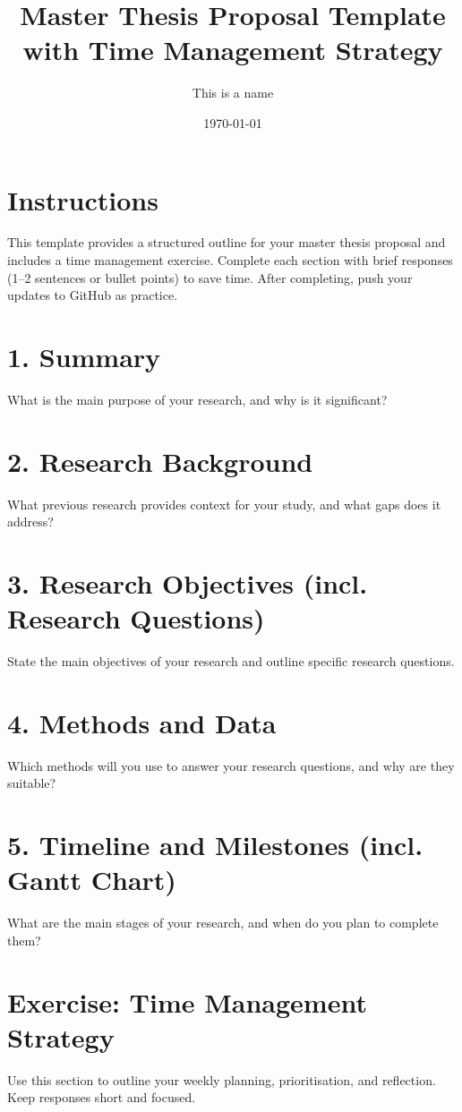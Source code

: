 \documentclass[a4paper,12pt]{article}
\title{Master Thesis Proposal Template with Time Management Strategy}
\author{This is a name}
\date{\today}
\begin{document}
\maketitle

\section*{Instructions}
This template provides a structured outline for your master thesis proposal and includes a time management exercise. Complete each section with brief responses (1–2 sentences or bullet points) to save time. After completing, push your updates to GitHub as practice.

\section{1. Summary}
What is the main purpose of your research, and why is it significant?\\

\section{2. Research Background}
What previous research provides context for your study, and what gaps does it address?\\

\section{3. Research Objectives (incl. Research Questions)}
State the main objectives of your research and outline specific research questions.


\section{4. Methods and Data}
Which methods will you use to answer your research questions, and why are they suitable?\\

\section{5. Timeline and Milestones (incl. Gantt Chart)}
What are the main stages of your research, and when do you plan to complete them?\\

\section{Exercise: Time Management Strategy}
Use this section to outline your weekly planning, prioritisation, and reflection. Keep responses short and focused.
\end{document}
